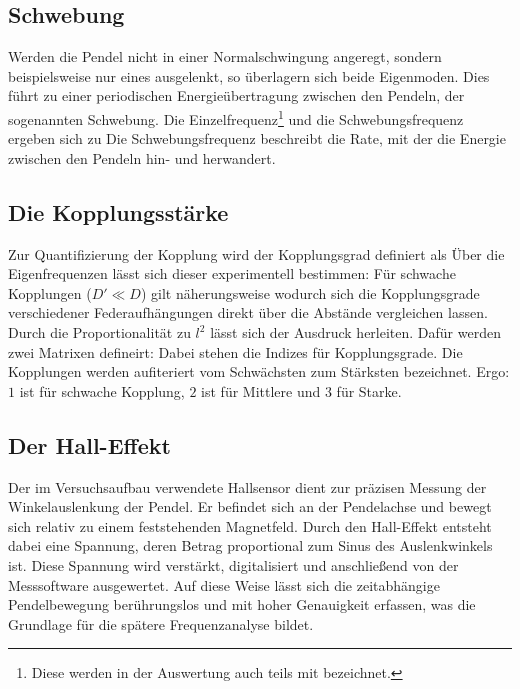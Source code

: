 \subsection{Schwebung}

Werden die Pendel nicht in einer Normalschwingung angeregt, sondern beispielsweise nur eines ausgelenkt, so überlagern sich beide Eigenmoden. Dies führt zu einer periodischen Energieübertragung zwischen den Pendeln, der sogenannten Schwebung. Die Einzelfrequenz\footnote{Diese werden in der Auswertung auch teils mit bezeichnet.} und die Schwebungsfrequenz ergeben sich zu
Die Schwebungsfrequenz beschreibt die Rate, mit der die Energie zwischen den Pendeln hin- und herwandert.

\subsection{Die Kopplungsstärke}

Zur Quantifizierung der Kopplung wird der Kopplungsgrad definiert als
Über die Eigenfrequenzen lässt sich dieser experimentell bestimmen:
Für schwache Kopplungen (\(D' \ll D\)) gilt näherungsweise
wodurch sich die Kopplungsgrade verschiedener Federaufhängungen direkt über die Abstände vergleichen lassen.
Durch die Proportionalität zu $l^2$ lässt sich der Ausdruck 
herleiten. Dafür werden zwei Matrixen defineirt:
Dabei stehen die Indizes für Kopplungsgrade. Die Kopplungen werden aufiteriert vom Schwächsten zum Stärksten bezeichnet. Ergo: $1$ ist für schwache Kopplung, $2$ ist für Mittlere und $3$ für Starke.

\subsection{Der Hall-Effekt}
Der im Versuchsaufbau verwendete Hallsensor dient zur präzisen Messung der Winkelauslenkung der Pendel. Er befindet sich an der Pendelachse und bewegt sich relativ zu einem feststehenden Magnetfeld. Durch den Hall-Effekt entsteht dabei eine Spannung, deren Betrag proportional zum Sinus des Auslenkwinkels ist. Diese Spannung wird verstärkt, digitalisiert und anschließend von der Messsoftware ausgewertet. Auf diese Weise lässt sich die zeitabhängige Pendelbewegung berührungslos und mit hoher Genauigkeit erfassen, was die Grundlage für die spätere Frequenzanalyse bildet.

